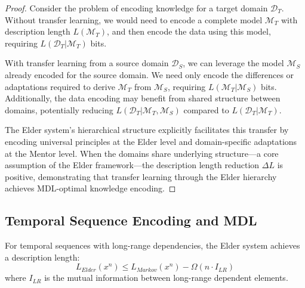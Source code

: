 \begin{proof}
Consider the problem of encoding knowledge for a target domain $\mathcal{D}_T$. Without transfer learning, we would need to encode a complete model $\mathcal{M}_T$ with description length $L(\mathcal{M}_T)$, and then encode the data using this model, requiring $L(\mathcal{D}_T | \mathcal{M}_T)$ bits.

With transfer learning from a source domain $\mathcal{D}_S$, we can leverage the model $\mathcal{M}_S$ already encoded for the source domain. We need only encode the differences or adaptations required to derive $\mathcal{M}_T$ from $\mathcal{M}_S$, requiring $L(\mathcal{M}_T | \mathcal{M}_S)$ bits. Additionally, the data encoding may benefit from shared structure between domains, potentially reducing $L(\mathcal{D}_T | \mathcal{M}_T, \mathcal{M}_S)$ compared to $L(\mathcal{D}_T | \mathcal{M}_T)$.

The Elder system's hierarchical structure explicitly facilitates this transfer by encoding universal principles at the Elder level and domain-specific adaptations at the Mentor level. When the domains share underlying structure—a core assumption of the Elder framework—the description length reduction $\Delta L$ is positive, demonstrating that transfer learning through the Elder hierarchy achieves MDL-optimal knowledge encoding.
\end{proof}

\subsection{Temporal Sequence Encoding and MDL}

\begin{theorem}
For temporal sequences with long-range dependencies, the Elder system achieves a description length:
\begin{equation}
L_{Elder}(x^n) \leq L_{Markov}(x^n) - \Omega(n \cdot I_{LR})
\end{equation}
where $I_{LR}$ is the mutual information between long-range dependent elements.
\end{theorem}


